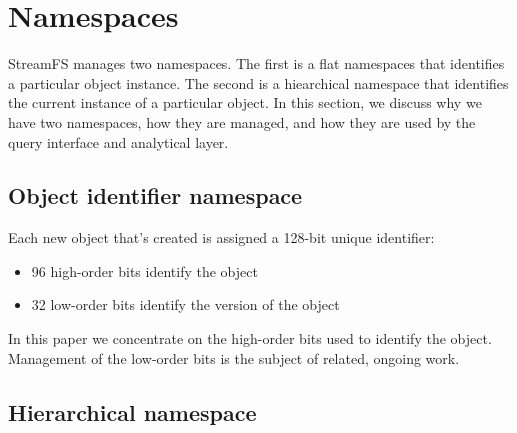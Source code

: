 \section{Namespaces}
StreamFS manages two namespaces.  The first is a flat namespaces that identifies a particular
object instance.  The second is a hiearchical namespace that identifies the current instance
of a particular object.  In this section, we discuss why we have two namespaces, how
they are managed, and how they are used by the query interface and analytical layer.

\subsection{Object identifier namespace}
Each new object that's created is assigned a 128-bit unique identifier:

\begin{itemize}
\item 96 high-order bits identify the object
\item 32 low-order bits identify the version of the object
\end{itemize}

In this paper we concentrate on the high-order bits used to identify the object.  Management of the low-order
bits is the subject of related, ongoing work.

\subsection{Hierarchical namespace}